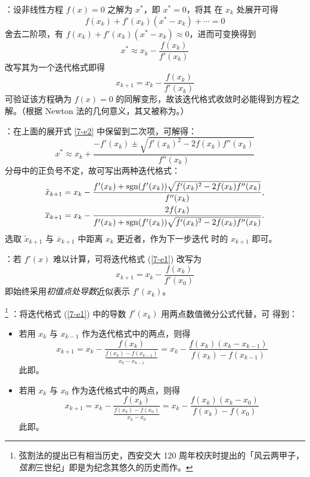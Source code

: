 \entry {}：设非线性方程 $f(x)=0$ 之解为 $x^\ast$，即 $x^\ast = 0$，将其
在 $x_k$ 处展开可得
\begin{equation}\label{7-e2}
f(x_k)+f'(x_k)(x^\ast-x_k)+\cdots = 0
\end{equation}
舍去二阶项，有 $f(x_k)+f'(x_k)(x^\ast-x_k)\approx0$，进而可变换得到
\[x^\ast\approx x_k-\frac{f(x_k)}{f'(x_k)}\]
改写其为一个迭代格式即得
\begin{equation}\label{7-e1}
x_{k+1} = x_k-\frac{f(x_k)}{f'(x_k)}
\end{equation}
可验证该方程确为 $f(x)=0$ 的同解变形，故该迭代格式收敛时必能得到方程之解。（根据 Newton 法的几何意义，其又被称为。）

\entry {}：在上面的展开式 \eqref{7-e2} 中保留到二次项，可解得：
\[ x^\ast\approx x_k+\frac{-f'(x_k)\pm\sqrt{f'(x_k)^2-2f(x_k)f''(x_k)}}{f''(x_k)} \]
分母中的正负号不定，故可写出两种迭代格式：
\begin{gather}
\tilde{x}_{k+1}=x_k-\frac{f'(x_k)+\operatorname{sgn}(f'(x_k))\sqrt{f'(x_k)^2-2f(x_k)f''(x_k)}
}{f''(x_k)},\\
\overline{x}_{k+1}=x_k-\frac{2f(x_k)}{f'(x_k)+\operatorname{sgn}(f'(x_k))\sqrt{f'(x_k)^2-2f(x_k)
f''(x_k)}}.
\end{gather}
选取 $\tilde{x}_{k+1}$ 与 $\overline{x}_{k+1}$ 中距离 $x_k$ 更近者，作为下一步迭代
时的 $x_{k+1}$ 即可。

\entry {}：若 $f'(x)$ 难以计算，可将迭代格式 (\ref{7-e1}) 改写为
\begin{equation}
x_{k+1}=x_k-\frac{f(x_k)}{f'(x_0)}
\end{equation}
即始终采用\emph{初值点处导数}近似表示 $f'(x_k)$。

\entry {}
\footnote{弦割法的提出已有相当历史，西安交大 120 周年校庆时提出的「风云两甲子，\emph{弦割}三世纪」即是为纪念其悠久的历史而作。}
：将迭代格式 (\ref{7-e1}) 中的导数 $f'(x_k)$ 用两点数值微分公式代替，可
得到：
\begin{itemize}
    \item 若用 $x_k$ 与 $x_{k-1}$ 作为迭代格式中的两点，则得
    \begin{equation}
    x_{k+1} = x_k-\frac{f(x_k)}{\frac{f(x_k)-f(x_{k-1})}{x_k-x_{k-1}}} =
    x_k-\frac{f(x_k)(x_k-x_{k-1})}{f(x_k)-f(x_{k-1})}
    \end{equation}
    此即。
    \item 若用 $x_k$ 与 $x_0$ 作为迭代格式中的两点，则得
    \begin{equation}
    x_{k+1} = x_k-\frac{f(x_k)}{\frac{f(x_k)-f(x_0)}{x_k-x_0}} =
    x_k-\frac{f(x_k)(x_k-x_0)}{f(x_k)-f(x_0)}
    \end{equation}
    此即。
\end{itemize}

